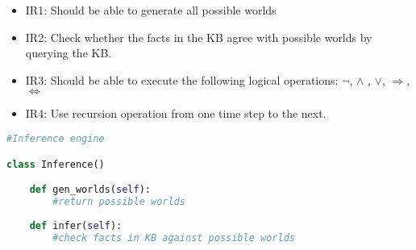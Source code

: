 \documentclass{article}
\begin{document}
\begin{itemize}
    \item IR1: Should be able to generate all possible worlds
    \item IR2: Check whether the facts in the KB agree with possible worlds by querying the KB.
    \item IR3: Should be able to execute the following logical operations:  $\neg$, $\wedge$ , $\vee$, $\Rightarrow$, $\Leftrightarrow$
    \item IR4: Use recursion operation from one time step to the next.
\end{itemize}



\begin{lstlisting}[language=Python, caption=Inference engine class outline]
#Inference engine

class Inference()

    def gen_worlds(self):
        #return possible worlds
        
    def infer(self):
        #check facts in KB against possible worlds

\end{lstlisting}





\end{document}
